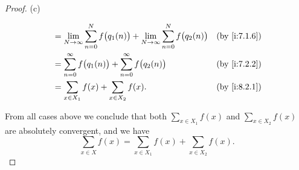 \begin{proof}{(c)}
\begin{itemize}
\begin{align*}
             & = \lim_{N \to \infty} \sum_{n = 0}^N f\big(q_1(n)\big) + \lim_{N \to \infty} \sum_{n = 0}^N f\big(q_2(n)\big) &  & \by{i:7.1.6}     \\
             & = \sum_{n = 0}^\infty f\big(q_1(n)\big) + \sum_{n = 0}^\infty f\big(q_2(n)\big)                               &  & \by{i:7.2.2}     \\
             & = \sum_{x \in X_1} f(x) + \sum_{x \in X_2} f(x).                                                              &  & \by{i:8.2.1}
          \end{align*}
  \end{itemize}
  From all cases above we conclude that both \(\sum_{x \in X_1} f(x)\) and \(\sum_{x \in X_2} f(x)\) are absolutely convergent, and we have
  \[
    \sum_{x \in X} f(x) = \sum_{x \in X_1} f(x) + \sum_{x \in X_2} f(x).
  \]


\end{proof}
